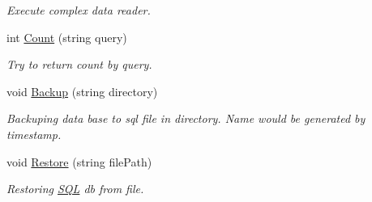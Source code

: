 \begin{DoxyCompactItemize}
\begin{DoxyCompactList}\small\item\em Execute complex data reader. \end{DoxyCompactList}\item 
int \mbox{\hyperlink{interface_uniform_data_operator_1_1_s_q_l_1_1_i_s_q_l_operator_a92feb21e03810b152f16f06d02d2034a}{Count}} (string query)
\begin{DoxyCompactList}\small\item\em Try to return count by query. \end{DoxyCompactList}\item 
void \mbox{\hyperlink{interface_uniform_data_operator_1_1_s_q_l_1_1_i_s_q_l_operator_acc29fb7a4b5c3d2dc91d5f9f32b91ca5}{Backup}} (string directory)
\begin{DoxyCompactList}\small\item\em Backuping data base to sql file in directory. Name would be generated by timestamp. \end{DoxyCompactList}\item 
void \mbox{\hyperlink{interface_uniform_data_operator_1_1_s_q_l_1_1_i_s_q_l_operator_ae55ed846c8954ddf7baa6d6dd2e8cb68}{Restore}} (string file\+Path)
\begin{DoxyCompactList}\small\item\em Restoring \mbox{\hyperlink{namespace_uniform_data_operator_1_1_s_q_l}{S\+QL}} db from file. \end{DoxyCompactList}\end{DoxyCompactItemize}
